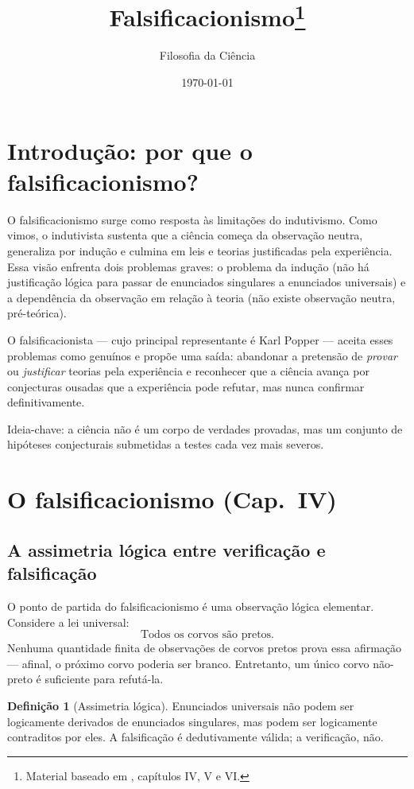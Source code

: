 \documentclass[9pt,a4paper]{extarticle}
\title{Falsificacionismo\footnote{Material baseado em \citet{chalmers1993}, capítulos IV, V e VI.}}
\author{Filosofia da Ciência}
\date{\today}
\newcommand{\impt}[1]{\textcolor{important}{#1}}
\newcommand{\ntc}[1]{\textcolor{notice}{#1}}
\theoremstyle{definition}
\newtheorem{definition}{Definição}[section]
\begin{document}
\maketitle
\tableofcontents

\bigskip

\section{Introdução: por que o falsificacionismo?}

O falsificacionismo surge como resposta às limitações do indutivismo. Como vimos, o indutivista sustenta que a ciência começa da observação neutra, generaliza por indução e culmina em leis e teorias justificadas pela experiência. Essa visão enfrenta dois problemas graves: o \impt{problema da indução} (não há justificação lógica para passar de enunciados singulares a enunciados universais) e a \impt{dependência da observação em relação à teoria} (não existe observação neutra, pré-teórica).

O falsificacionista --- cujo principal representante é Karl Popper --- aceita esses problemas como genuínos e propõe uma saída: abandonar a pretensão de \emph{provar} ou \emph{justificar} teorias pela experiência e reconhecer que a ciência avança por \impt{conjecturas ousadas} que a experiência pode \impt{refutar}, mas nunca confirmar definitivamente.

\ntc{Ideia-chave:} a ciência não é um corpo de verdades provadas, mas um conjunto de hipóteses conjecturais submetidas a testes cada vez mais severos.

\section{O falsificacionismo (Cap.~IV)}

\subsection{A assimetria lógica entre verificação e falsificação}

O ponto de partida do falsificacionismo é uma observação lógica elementar. Considere a lei universal:
\[
\text{Todos os corvos são pretos.}
\]
Nenhuma quantidade finita de observações de corvos pretos prova essa afirmação --- afinal, o próximo corvo poderia ser branco. Entretanto, \impt{um único} corvo não-preto é suficiente para refutá-la.

\begin{definition}[Assimetria lógica]
Enunciados universais não podem ser logicamente derivados de enunciados singulares, mas podem ser logicamente contraditos por eles. A falsificação é dedutivamente válida; a verificação, não.
\end{definition}
\end{document}
